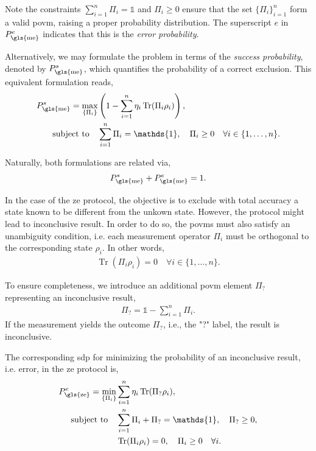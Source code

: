 \documentclass[12pt,letterpaper]{article}
\DeclareMathOperator{\tr}{Tr}
\begin{document}
Note the constraints $\sum_{i=1}^n \Pi_i = \mathds{1}$ and $\Pi_i \geq 0$ ensure that the set $\{\Pi_i\}_{i=1}^n$ form a valid \gls{povm}, raising a proper probability distribution. The superscript $e$ in $P_{\text{\gls{me}}}^e$ indicates that this is the \emph{error probability}.

Alternatively, we may formulate the problem in terms of the \emph{success probability}, denoted by $P_{\text{\gls{me}}}^s$, which quantifies the probability of a correct exclusion. This equivalent formulation reads,
\begin{align*}
	P_{\text{\gls{me}}}^s = \max_{\left\{\Pi_i\right\}} &\left(1 - \sum_{i=1}^n \eta_i\tr(\Pi_i \rho_i)\right),\\
	\text{subject to} \quad & \sum_{i=1}^n \Pi_i = \mathds{1}, \quad \Pi_i \geq 0 \quad \forall i \in \{1, \dots, n\}.
\end{align*}

Naturally, both formulations are related via,
\begin{align*}
P_{\text{\gls{me}}}^s + P_{\text{\gls{me}}}^e = 1.
\end{align*}

In the case of the \gls{ze} protocol, the objective is to exclude with total accuracy a state known to be different from the unkown state. However, the protocol might lead to inconclusive result. In order to do so, the \gls{povm}s must also satisfy an unambiguity condition, i.e. each measurement operator $\Pi_i$ must be orthogonal to the corresponding state $\rho_i$. In other words,
\begin{align*}
\tr(\Pi_i \rho_i) = 0 \quad \forall i \in \{1, \dots, n\}.
\end{align*}

To ensure completeness, we introduce an additional \gls{povm} element $\Pi_?$ representing an inconclusive result,
\begin{align*}
\Pi_? = \mathds{1} - \sum_{i=1}^n \Pi_i.
\end{align*}
If the measurement yields the outcome $\Pi_?$, i.e., the "?" label, the result is inconclusive.

The corresponding \gls{sdp} for minimizing the probability of an inconclusive result, i.e. error, in the \gls{ze} protocol is,
\begin{align*}
	P_{\text{\gls{ze}}}^e = \min_{\left\{\Pi_i\right\}} &\sum_{i=1}^n \eta_i\tr(\Pi_? \rho_i),\\
	\text{subject to} \quad & \sum_{i=1}^n \Pi_i + \Pi_? = \mathds{1}, \quad \Pi_? \geq 0,\\
	& \tr(\Pi_i \rho_i) = 0, \quad \Pi_i \geq 0 \quad \forall i.
\end{align*}
\end{document}
